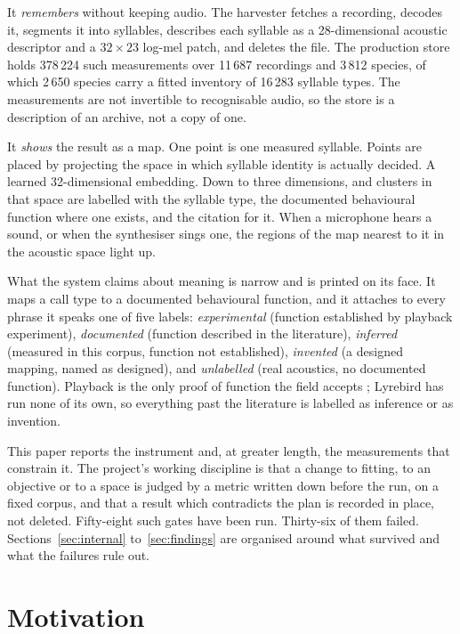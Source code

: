 \documentclass[10pt,twocolumn,a4paper]{article}
\begin{document}
It \emph{remembers} without keeping audio. The harvester fetches a recording, decodes it,
segments it into syllables, describes each syllable as a 28-dimensional acoustic
descriptor and a $32 \times 23$ log-mel patch, and deletes the file. The production store
holds 378\,224 such measurements over 11\,687 recordings and 3\,812 species, of which
2\,650 species carry a fitted inventory of 16\,283 syllable types.
The measurements are not invertible to recognisable audio, so the store is a description
of an archive, not a copy of one.

It \emph{shows} the result as a map. One point is one measured syllable. Points are placed
by projecting the space in which syllable identity is actually decided. A learned
32-dimensional embedding. Down to three dimensions, and clusters in that space are
labelled with the syllable type, the documented behavioural function where one exists, and
the citation for it. When a microphone hears a sound, or when the synthesiser sings one,
the regions of the map nearest to it in the acoustic space light up.

What the system claims about meaning is narrow and is printed on its face. It maps a call
type to a documented behavioural function, and it attaches to every phrase it speaks one of
five labels: \emph{experimental} (function established by playback experiment),
\emph{documented} (function described in the literature), \emph{inferred} (measured in this
corpus, function not established), \emph{invented} (a designed mapping, named as designed),
and \emph{unlabelled} (real acoustics, no documented function). Playback is the only proof
of function the field accepts \citep{rutz2023}; Lyrebird has run none of its own, so
everything past the literature is labelled as inference or as invention.

This paper reports the instrument and, at greater length, the measurements that constrain
it. The project's working discipline is that a change to fitting, to an objective or to a
space is judged by a metric written down before the run, on a fixed corpus, and that a
result which contradicts the plan is recorded in place, not deleted. Fifty-eight such
gates have been run. Thirty-six of them failed. Sections~\ref{sec:internal}
to~\ref{sec:findings} are organised around what survived and what the failures rule out.

\section{Motivation}
\label{sec:why}
\end{document}
